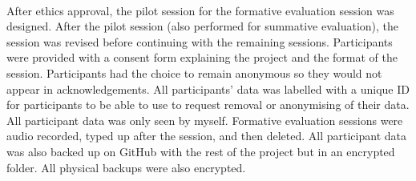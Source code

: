 \paragraph{} After ethics approval, the pilot session for the formative evaluation session was designed. After the pilot session (also performed for summative evaluation), the session was revised before continuing with the remaining sessions. Participants were provided with a consent form explaining the project and the format of the session. Participants had the choice to remain anonymous so they would not appear in acknowledgements. All participants' data was labelled with a unique ID for participants to be able to use to request removal or anonymising of their data. All participant data was only seen by myself. Formative evaluation sessions were audio recorded, typed up after the session, and then deleted. All participant data was also backed up on GitHub with the rest of the project but in an encrypted folder. All physical backups were also encrypted.
